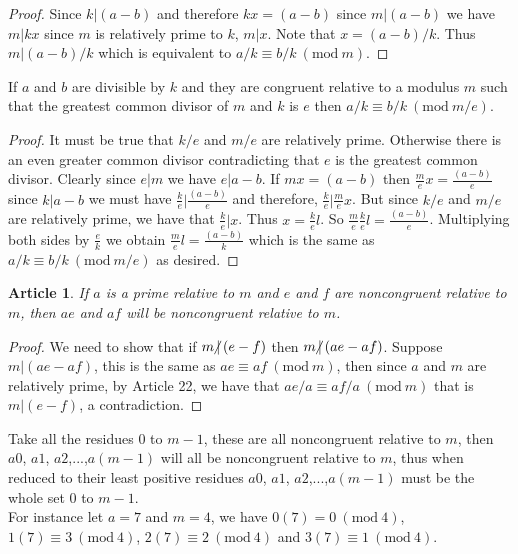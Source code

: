 \documentclass{article}
\theoremstyle{problemstyle}
\newtheorem{article}{Article}
\newcommand{\Mod}[1]{\ (\mathrm{mod}\ #1)}
\newcommand{\ndiv}{\hspace{-4pt}\not|\hspace{2pt}}
\begin{document}
\begin{proof}
Since $k|(a-b)$ and therefore $kx = (a-b)$ since $m|(a-b)$ we have $m|kx$ since $m$ is relatively prime to $k$,  $m|x$. Note that $x = (a-b)/k$. Thus $m|(a-b)/k$ which is equivalent to $a/k \equiv b/k \Mod{m}$.
\end{proof}

If $a$ and $b$ are divisible by $k$ and they are congruent relative to a modulus $m$ such that the greatest common divisor of $m$ and $k$ is $e$ then $a/k \equiv b/k \Mod{m/e}$.

\begin{proof}
It must be true that $k/e$ and $m/e$ are relatively prime. Otherwise there is an even greater common divisor contradicting that $e$ is the greatest common divisor. Clearly since $e|m$ we have $e|a-b$. If $mx = (a-b)$ then $\frac{m}{e}x = \frac{(a-b)}{e}$ since $k|a-b$ we must have $\frac{k}{e}|\frac{(a-b)}{e}$ and therefore, $\frac{k}{e}|\frac{m}{e}x$. But since $k/e$ and $m/e$ are relatively prime, we have that $\frac{k}{e}|x$. Thus $x = \frac{k}{e}l$. So $\frac{m}{e}\frac{k}{e}l = \frac{(a-b)}{e}$. Multiplying both sides by $\frac{e}{k}$ we obtain $\frac{m}{e}l = \frac{(a-b)}{k}$ which is the same as $a/k \equiv b/k \Mod{m/e}$ as desired. 
\end{proof}

\begin{article}
If $a$ is a prime relative to $m$ and $e$ and $f$ are noncongruent relative to $m$, then $ae$ and $af$ will be noncongruent relative to $m$.    
\end{article}

\begin{proof}
We need to show that if $m\ndiv (e-f)$ then $m \ndiv (ae-af)$. Suppose $m | (ae-af)$, this is the same as $ae\equiv af \Mod{m}$, then since $a$ and $m$ are relatively prime, by Article 22, we have that $ae/a \equiv af/a \Mod{m}$ that is $m|(e-f)$, a contradiction. 
\end{proof}

Take all the residues $0$ to $m-1$, these are all noncongruent relative to $m$, then $a0$, $a1$, $a2$,...,$a(m-1)$ will all be noncongruent relative to $m$, thus when reduced to their least positive residues $a0$, $a1$, $a2$,...,$a(m-1)$ must be the whole set $0$ to $m-1$.\\ 

For instance let $a = 7$ and $m = 4$, we have  $0(7) = 0 \Mod{4}$, $1(7) \equiv 3 \Mod{4}$, $2(7) \equiv 2 \Mod{4}$ and $3(7) \equiv 1 \Mod{4}$. 
\end{document}
